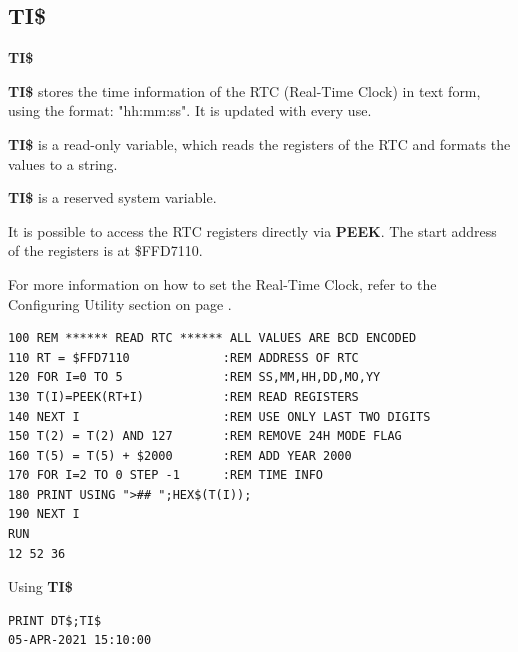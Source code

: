 \subsection{TI\$}
\begin{description}[leftmargin=2cm,style=nextline]
\item [Format:] {\bf TI\$}
\item [Usage:]  {\bf TI\$} stores the time information of the RTC
                (Real-Time Clock) in text form, using the format:
                "hh:mm:ss". It is updated with every use.

                {\bf TI\$} is a read-only variable, which
                reads the registers of the RTC and formats the values
                to a string.

\item [Remarks:]
                {\bf TI\$} is a reserved system variable.

                It is possible to access the RTC registers directly
                via {\bf PEEK}. The start address of the registers is at
                \$FFD7110.

                For more information on how to set the Real-Time Clock,
                refer to the Configuring Utility section on page
                \pageref{sec:configuration-utility}.

\begin{tcolorbox}[colback=black,coltext=white]
\verbatimfont{\codefont}
\begin{verbatim}
100 REM ****** READ RTC ****** ALL VALUES ARE BCD ENCODED
110 RT = $FFD7110             :REM ADDRESS OF RTC
120 FOR I=0 TO 5              :REM SS,MM,HH,DD,MO,YY
130 T(I)=PEEK(RT+I)           :REM READ REGISTERS
140 NEXT I                    :REM USE ONLY LAST TWO DIGITS
150 T(2) = T(2) AND 127       :REM REMOVE 24H MODE FLAG
160 T(5) = T(5) + $2000       :REM ADD YEAR 2000
170 FOR I=2 TO 0 STEP -1      :REM TIME INFO
180 PRINT USING ">## ";HEX$(T(I));
190 NEXT I
RUN
12 52 36
\end{verbatim}
\end{tcolorbox}

\item [Example:] Using {\bf TI\$}
\begin{tcolorbox}[colback=black,coltext=white]
\verbatimfont{\codefont}
\begin{verbatim}
PRINT DT$;TI$
05-APR-2021 15:10:00
\end{verbatim}
\end{tcolorbox}
\end{description}

